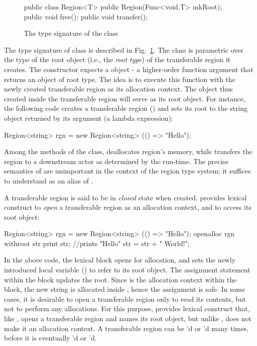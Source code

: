 \begin{figure}
\begin{codejava}
  public class Region<T> {
    public Region(Func<void,T> mkRoot);
    public void free();
    public void transfer();
  }
\end{codejava}
\caption{The type signature of the  class}
\label{fig:region-class}
\end{figure}
The type signature of  class is described in
Fig.~\ref{fig:region-class}. The class is parametric over the type of
the root object (i.e., the \emph{root type}) of the transferable
region it creates. The  constructor expects a 
object - a higher-order function argument that returns an object of
root type.  The idea is to execute this function with the newly
created transferable region as its allocation context. The object thus
created inside the transferable region will serve as its root object.
For instance, the following code creates a transferable region
() and sets its root to the string object returned by its
 argument (a lambda expression):
\begin{codejava}
  Region<string> rgn = new Region<string>
                        (() => "Hello");
\end{codejava}
Among the methods of the  class,  deallocates
region's memory, while  transfers the region to a
downstream actor as determined by the run-time. The precise semantics
of  are unimportant in the context of the region type
system; it suffices to understand  as an alias of
.

A transferable region is said to be in \emph{closed} state when
created. \name provides  lexical construct to \emph{open}
a transferable region as an allocation context, and to access its root
object:
\begin{codejava}
  Region<string> rgn = new Region<string>
                        (() => "Hello");
  openalloc rgn withroot str {
    print str; //prints "Hello"
    str = str + " World!"; 
  }
\end{codejava}
In the above code, the  lexical block opens  for
allocation, and sets the newly introduced local variable () to
refer to its root object.  The assignment statement within the block
updates the root. Since  is the allocation context within the
block, the new string is allocated inside , hence the
assignment is safe. In some cases, it is desirable to open a
transferable region only to read its contents, but not to perform any
allocations. For this purpose, \name provides  lexical
construct that, like , opens a transferable region and
names its root object, but unlike , does not make it an
allocation context. A transferable region can be 'd or
'd many times, before it is eventually 'd or
'd.

